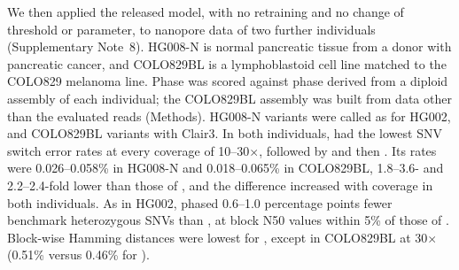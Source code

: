 We then applied the released model, with no retraining and no change of threshold or parameter, to nanopore data of two further individuals (Supplementary Note~8). HG008-N is normal pancreatic tissue from a donor with pancreatic cancer\cite{mcdaniel2025hg008}, and COLO829BL is a lymphoblastoid cell line matched to the COLO829 melanoma line\cite{sohn2026colo829}. Phase was scored against phase derived from a diploid assembly of each individual; the COLO829BL assembly was built from data other than the evaluated reads (Methods). HG008-N variants were called as for HG002, and COLO829BL variants with Clair3\cite{zheng2022clair3}. In both individuals, \toolname had the lowest SNV switch error rates at every coverage of 10--30$\times$, followed by \whatshap and then \hapcut. Its rates were 0.026--0.058\% in HG008-N and 0.018--0.065\% in COLO829BL, 1.8--3.6- and 2.2--2.4-fold lower than those of \whatshap, and the difference increased with coverage in both individuals. As in HG002, \toolname phased 0.6--1.0 percentage points fewer benchmark heterozygous SNVs than \whatshap, at block N50 values within 5\% of those of \whatshap. Block-wise Hamming distances were lowest for \toolname, except in COLO829BL at 30$\times$ (0.51\% versus 0.46\% for \whatshap).

